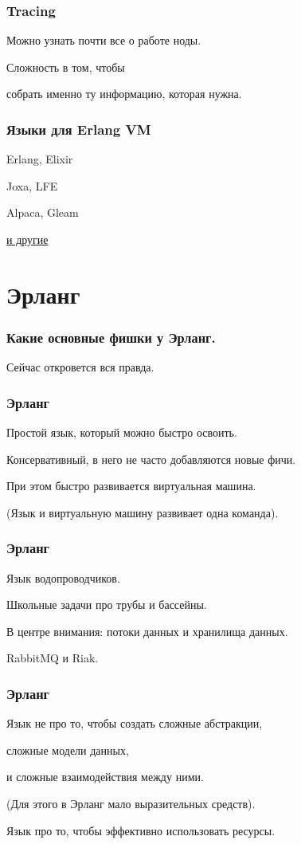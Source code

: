 \documentclass[10pt]{beamer}
\begin{document}
\begin{frame}
\frametitle{Tracing}
\centering
Можно узнать почти все о работе ноды.
\par \bigskip
Сложность в том, чтобы
\par
собрать именно ту информацию, которая нужна.
\end{frame}

\begin{frame}
\frametitle{Языки для Erlang VM}
\centering
Erlang, Elixir
\par \bigskip
Joxa, LFE
\par \bigskip
Alpaca, Gleam
\par \bigskip
\textcolor{blue}{\href{https://github.com/llaisdy/beam_languages}{и другие}}
\end{frame}


\section{Эрланг}

{
\begin{frame}
\frametitle{Какие основные фишки у Эрланг.}
\centering
Сейчас откровется вся правда.
\end{frame}
}

\begin{frame}
\frametitle{Эрланг}
\centering
Простой язык, который можно быстро освоить.
\par \bigskip
Консервативный, в него не часто добавляются новые фичи.
\par \bigskip
При этом быстро развивается виртуальная машина.
\par \bigskip
(Язык и виртуальную машину развивает одна команда).
\end{frame}

\begin{frame}
\frametitle{Эрланг}
\centering
Язык водопроводчиков.
\par \bigskip
Школьные задачи про трубы и бассейны.
\par \bigskip
В центре внимания: потоки данных и хранилища данных.
\par \bigskip
RabbitMQ и Riak.
\end{frame}

\begin{frame}
\frametitle{Эрланг}
\centering
Язык не про то, чтобы создать сложные абстракции,
\par
сложные модели данных,
\par
и сложные взаимодействия между ними.
\par \bigskip
(Для этого в Эрланг мало выразительных средств).
\par \bigskip
Язык про то, чтобы эффективно использовать ресурсы.
\end{frame}
\end{document}
